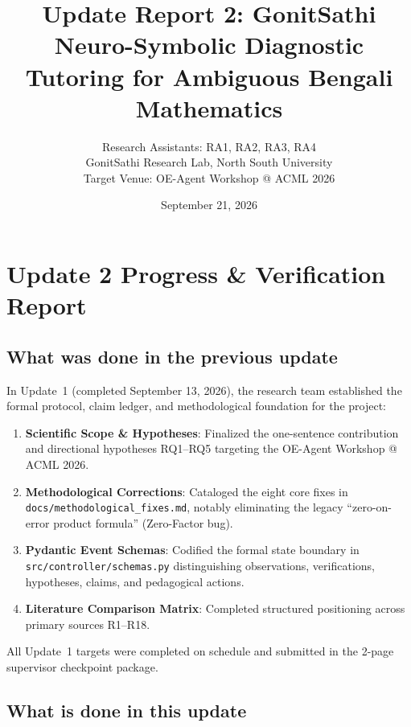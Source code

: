 \documentclass[lettersize,onecolumn,journal]{IEEEtran}
\begin{document}
\title{Update Report 2: GonitSathi\\
\large Neuro-Symbolic Diagnostic Tutoring for Ambiguous Bengali Mathematics}
\date{September 21, 2026}
\author{Research Assistants: RA1, RA2, RA3, RA4\\
GonitSathi Research Lab, North South University\\
Target Venue: OE-Agent Workshop @ ACML 2026}
\maketitle

\section{Update 2 Progress \& Verification Report}

\subsection{What was done in the previous update}

In Update~1 (completed September 13, 2026), the research team established the formal protocol, claim ledger, and methodological foundation for the project:
\begin{enumerate}
    \item \textbf{Scientific Scope \& Hypotheses}: Finalized the one-sentence contribution and directional hypotheses RQ1--RQ5 targeting the OE-Agent Workshop @ ACML 2026.
    \item \textbf{Methodological Corrections}: Cataloged the eight core fixes in \texttt{docs/methodological\_fixes.md}, notably eliminating the legacy ``zero-on-error product formula'' (Zero-Factor bug).
    \item \textbf{Pydantic Event Schemas}: Codified the formal state boundary in \texttt{src/controller/schemas.py} distinguishing observations, verifications, hypotheses, claims, and pedagogical actions.
    \item \textbf{Literature Comparison Matrix}: Completed structured positioning across primary sources R1--R18.
\end{enumerate}

All Update~1 targets were completed on schedule and submitted in the 2-page supervisor checkpoint package.

\subsection{What is done in this update}
\end{document}

